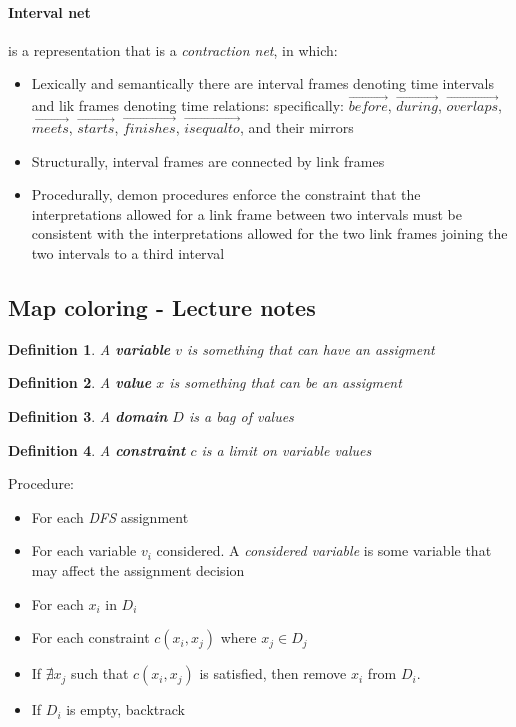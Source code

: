 \documentclass{article}
\newtheorem{definition}{Definition}
\begin{document}
\paragraph{Interval net} is a representation that is a
\textit{contraction net}, in which:
\begin{itemize}
  \item Lexically and semantically there are interval frames
    denoting time intervals and lik frames denoting time
    relations: specifically: $\overrightarrow{before}$,
    $\overrightarrow{during}$, $\overrightarrow{overlaps}$,
    $\overrightarrow{meets}$, $\overrightarrow{starts}$,
    $\overrightarrow{finishes}$, $\overrightarrow{is equal to}$,
    and their mirrors
  \item Structurally, interval frames are connected by link
    frames
  \item Procedurally, demon procedures enforce the constraint
    that the interpretations allowed for a link frame between two
    intervals must be consistent with the interpretations allowed
    for the two link frames joining the two intervals to a third
    interval
\end{itemize}

\subsection{Map coloring - Lecture notes}

\begin{definition}
  A \textbf{variable} $v$ is something that can have an assigment
\end{definition}

\begin{definition}
  A \textbf{value} $x$ is something that can be an assigment
\end{definition}

\begin{definition}
  A \textbf{domain} $D$ is a bag of values
\end{definition}

\begin{definition}
  A \textbf{constraint} $c$ is a limit on variable values
\end{definition}

Procedure:
\begin{itemize}
  \item For each \textit{DFS} assignment
  \item For each variable $v_i$ considered.  A \textit{considered 
    variable} is some variable that may affect the assignment decision
  \item For each $x_i$ in $D_i$
  \item For each constraint $c(x_i, x_j)$ where $x_j \in D_j$
  \item If $\nexists x_j$ such that $c(x_i, x_j)$ is satisfied,
    then remove $x_i$ from $D_i$.
  \item If $D_i$ is empty, backtrack
\end{itemize}
\end{document}

